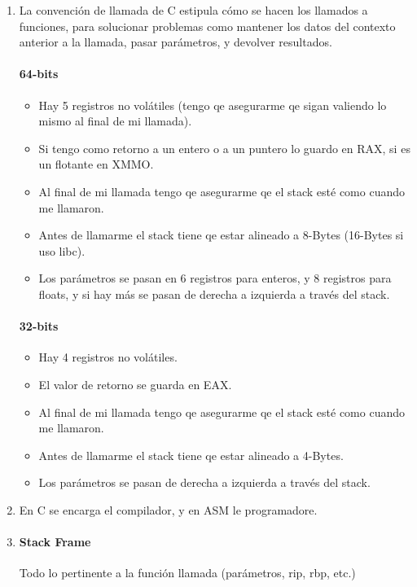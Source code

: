 

\begin{enumerate}
\item La convención de llamada de C estipula cómo se hacen los llamados a funciones, para solucionar problemas como mantener los datos del contexto anterior a la llamada, pasar parámetros, y devolver resultados.
  \paragraph{64-bits} \begin{itemize}
    \item Hay 5 registros no volátiles (tengo qe asegurarme qe sigan valiendo lo mismo al final de mi llamada).
    \item Si tengo como retorno a un entero o a un puntero lo guardo en RAX, si es un flotante en XMMO.
    \item Al final de mi llamada tengo qe asegurarme qe el stack esté como cuando me llamaron.
    \item Antes de llamarme el stack tiene qe estar alineado a 8-Bytes (16-Bytes si uso libc).
    \item Los parámetros se pasan en 6 registros para enteros, y 8 registros para floats, y si hay más se pasan de derecha a izquierda a través del stack.
  \end{itemize}
  \paragraph{32-bits} \begin{itemize}
    \item Hay 4 registros no volátiles.
    \item El valor de retorno se guarda en EAX.
    \item Al final de mi llamada tengo qe asegurarme qe el stack esté como cuando me llamaron.
    \item Antes de llamarme el stack tiene qe estar alineado a 4-Bytes.
    \item Los parámetros se pasan de derecha a izquierda a través del stack.
  \end{itemize}

\item En C se encarga el compilador, y en ASM le programadore.

\item \paragraph{Stack Frame} Todo lo pertinente a la función llamada (parámetros, rip, rbp, etc.)

\end{enumerate}
